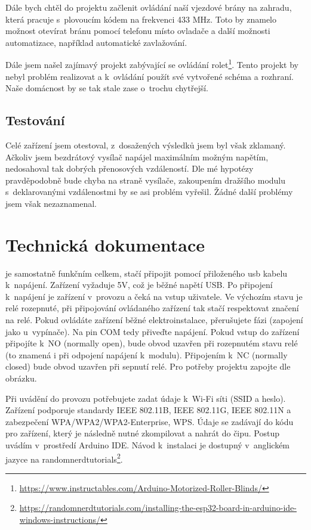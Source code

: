 \documentclass[11pt,a4paper,twoside,openright]{report}
\begin{document}
	
	Dále bych chtěl do projektu začlenit ovládání naší vjezdové brány na zahradu, která pracuje s~plovoucím kódem na frekvenci 433 MHz. Toto by znamelo možnost otevírat bránu pomocí telefonu místo ovladače a další možnosti automatizace, například automatické zavlažování.
	
	
	Dále jsem našel zajímavý projekt zabývající se ovládání rolet\footnote{\url{https://www.instructables.com/Arduino-Motorized-Roller-Blinds/}}. Tento projekt by nebyl problém realizovat a k~ovládání použít své vytvořené schéma a rozhraní. Naše domácnost by se tak stale zase o~trochu chytřejší.
	
	\section{Testování}
	Celé zařízení jsem otestoval, z~dosažených výsledků jsem byl však zklamaný. Ačkoliv jsem bezdrátový vysílač napájel maximálním možným napětím, nedosahoval tak dobrých přenosových vzdáleností. Dle mé hypotézy pravděpodobně bude chyba na straně vysílače, zakoupením dražšího modulu s~deklarovanými vzdálenostmi by se asi problém vyřešil. Žádné další problémy jsem však nezaznamenal.
	
	\chapter{Technická dokumentace}
	
	 je samostatně funkčním celkem, stačí připojit pomocí přiloženého usb kabelu k~napájení. Zařízení vyžaduje 5V, což je běžné napětí USB. Po připojení k~napájení je zařízení v~provozu a čeká na vstup uživatele. Ve výchozím stavu je relé rozepnuté, při připojování ovládaného zařízení tak stačí respektovat značení na relé. Pokud ovládáte zařízení běžné elektroinstalace, přerušujete fázi (zapojení jako u~vypínače). Na pin COM tedy přiveďte napájení. Pokud vstup do zařízení připojíte k~NO (normally open), bude obvod uzavřen při rozepnutém stavu relé (to znamená i při odpojení napájení k~modulu). Připojením k~NC (normally closed) bude obvod uzavřen při sepnutí relé. Pro potřeby projektu zapojte dle obrázku.
	
	
	Při uvádění  do provozu potřebujete zadat údaje k~Wi-Fi síti (SSID a heslo). Zařízení podporuje standardy IEEE 802.11B, IEEE 802.11G, IEEE 802.11N a zabezpečení WPA/WPA2/WPA2-Enterprise, WPS. Údaje se zadávají do kódu pro zařízení, který je následně nutné zkompilovat a nahrát do čipu. Postup uvádím v~prostředí Arduino IDE. Návod k~instalaci je dostupný v~anglickém jazyce na randomnerdtutorials\footnote{\url{https://randomnerdtutorials.com/installing-the-esp32-board-in-arduino-ide-windows-instructions/}}.
	
\end{document}
